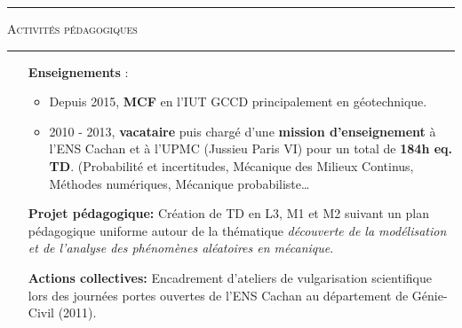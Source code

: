 \documentclass[a4paper,11pt]{article}
\newcommand{\titre}[1]{
  \begin{center}
    \rule{0.4\textwidth}{0.5pt}
    \par\vspace{0.1cm}
    \textsc{\large #1}
    \par\vspace{-0.2cm}
    \par\noindent\rule{0.4\textwidth}{0.5pt}
  \end{center}
}
\begin{document}
\titre{Activités pédagogiques}
\begin{itemize}
\item[\textbf{Enseignements}]:
  \begin{itemize}
  \item Depuis 2015, \textbf{MCF} en l'IUT GCCD principalement en géotechnique.
  \item 2010 - 2013, \textbf{vacataire} puis chargé d'une \textbf{mission d'enseignement} à l'ENS Cachan et à l'UPMC (Jussieu Paris VI) pour un total de \textbf{184h eq. TD}. (Probabilité et incertitudes, Mécanique des Milieux Continus, Méthodes numériques, Mécanique probabiliste\dots
  \end{itemize}
  \item[\textbf{Projet pédagogique:}] Création de TD en L3, M1 et M2 suivant un plan pédagogique uniforme autour de la thématique \og\emph{découverte de la modélisation et de l’analyse des phénomènes aléatoires en mécanique}\fg.\\
  \item[\textbf{Actions collectives:}] Encadrement d'ateliers de vulgarisation scientifique lors des journées portes ouvertes de l'ENS Cachan au département de Génie-Civil (2011).\\
\end{itemize}
\vfill
\end{document}
